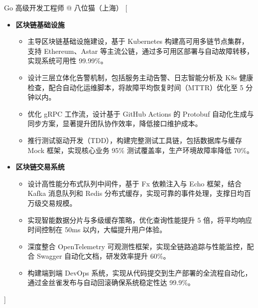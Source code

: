 \documentclass[zh]{resume}
\begin{document}
\begin{experiences}
    {Go 高级开发工程师 @ 八位猫（上海）}%
    [\begin{itemize}
      \item \textbf{区块链基础设施}
        \begin{itemize}
          \item 主导区块链基础设施建设，基于 Kubernetes 构建高可用多链节点集群，支持 Ethereum、Astar 等主流公链，通过多可用区部署与自动故障转移，实现系统可用性 99.99\%。
          \item 设计三层立体化告警机制，包括服务主动告警、日志智能分析及 K8s 健康检查，配合自动化运维脚本，将故障平均恢复时间（MTTR）优化至 5 分钟以内。
          \item 优化 gRPC 工作流，设计基于 GitHub Actions 的 Protobuf 自动化生成与同步方案，显著提升团队协作效率，降低接口维护成本。
          \item 推行测试驱动开发（TDD），构建完整测试工具链，包括数据库与缓存 Mock 框架，实现核心业务 95\% 测试覆盖率，生产环境故障率降低 70\%。
        \end{itemize}
      \item \textbf{区块链交易系统}
        \begin{itemize}
          \item 设计高性能分布式队列中间件，基于 Fx 依赖注入与 Echo 框架，结合 Kafka 消息队列和 Redis 分布式缓存，实现可靠的事件处理，支撑日均百万级交易规模。
          \item 实现智能数据分片与多级缓存策略，优化查询性能提升 5 倍，将平均响应时间控制在 50ms 以内，大幅提升用户体验。
          \item 深度整合 OpenTelemetry 可观测性框架，实现全链路追踪与性能监控，配合 Swagger 自动化文档，研发效率提升 60\%。
          \item 构建端到端 DevOps 系统，实现从代码提交到生产部署的全流程自动化，通过金丝雀发布与自动回滚确保系统稳定性达 99.9\%。
        \end{itemize}
      \end{itemize}]
\end{experiences}
\end{document}
